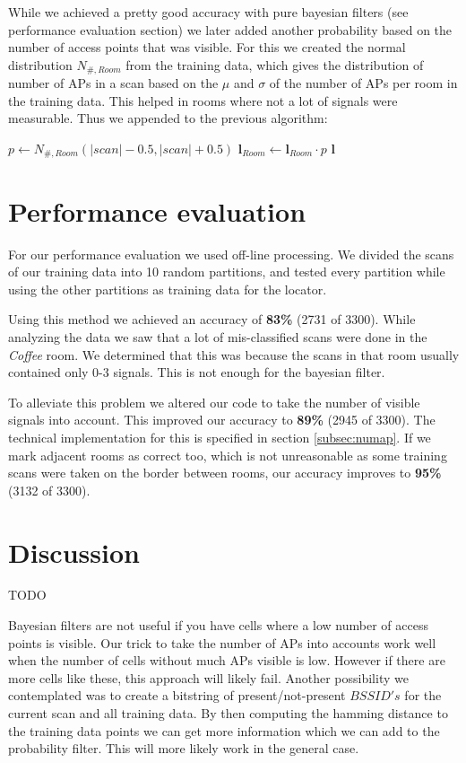 \documentclass[a4paper,10pt,twoside]{IEEEtran}
\begin{document}
While we achieved a pretty good accuracy with pure bayesian filters (see performance evaluation section) we later added another probability based on the number of access points that was visible.
For this we created the normal distribution $N_{\#,Room}$ from the training data, which gives the distribution of number of APs in a scan based on the $\mu$ and $\sigma$ of the number of APs per room in the training data.
This helped in rooms where not a lot of signals were measurable. Thus we appended to the previous algorithm:
\begin{algorithmic}
			\State $p \gets N_{\#,Room}(|scan|-0.5,|scan|+0.5)$
			\State $\mathbf{l}_{Room} \gets \mathbf{l}_{Room} \cdot p $
		\EndFor
		\State {} $\mathbf{l}$
	\EndIf
\end{algorithmic}


\section{Performance evaluation}
\label{sec:evaluation}

For our performance evaluation we used off-line processing. We divided the scans of our training data into 10 random partitions, and tested every partition while using the other partitions as training data for the locator.

Using this method we achieved an accuracy of \textbf{83\%} (2731 of 3300).
While analyzing the data we saw that a lot of mis-classified scans were done in the \emph{Coffee} room.
We determined that this was because the scans in that room usually contained only 0-3 signals.
This is not enough for the bayesian filter.

To alleviate this problem we altered our code to take the number of visible signals into account.
This improved our accuracy to \textbf{89\%} (2945 of 3300).
The technical implementation for this is specified in section \ref{subsec:numap}.
If we mark adjacent rooms as correct too, which is not unreasonable as some training scans were taken on the border between rooms, our accuracy improves to \textbf{95\%} (3132 of 3300).

\newpage

\section{Discussion}
\label{sec:discussion}
TODO

Bayesian filters are not useful if you have cells where a low number of access points is visible.
Our trick to take the number of APs into accounts work well when the number of cells without much APs visible is low.
However if there are more cells like these, this approach will likely fail.
Another possibility we contemplated was to create a bitstring of present/not-present $BSSID's$ for the current scan and all training data.
By then computing the hamming distance to the training data points we can get more information which we can add to the probability filter.
This will more likely work in the general case.



\newpage




\newpage
\appendix
\end{document}
